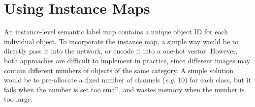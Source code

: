 \documentclass[10pt,twocolumn,letterpaper]{article}
\begin{document}
\section{Using Instance Maps}
An instance-level semantic label map contains a unique object ID for each individual object. To incorporate the instance map, a simple way would be to directly pass it into the network, or encode it into a one-hot vector. However, both approaches are difficult to implement in practice, since different images may contain different numbers of objects of the same category. A simple solution would be to pre-allocate a fixed number of channels (\emph{e.g.} 10) for each
class, but it fails when the number is set too small, and wastes memory when the number is too large.



{\small


}
\end{document}
